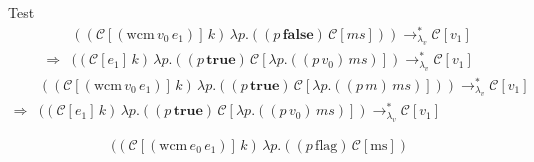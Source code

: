 \documentclass[ms,electronic,twosidetoc,letterpaper,chaptercenter,parttop]{byumsphd}
\begin{document}








\begin{theorem}
Test
\begin{align*}
            &((\mathcal{C}[(\mathrm{wcm}\,v_0\,e_1)]\,k)\,\lambda p.((p\,\mathbf{false})\,\mathcal{C}[\mathit{ms}]))\rightarrow_{\lambda_{v}}^{*}\mathcal{C}[v_1]\\
\Rightarrow &((\mathcal{C}[e_1]\,k)\,\lambda p.((p\,\mathbf{true})\,\mathcal{C}[\lambda p.((p\,v_0)\,\mathit{ms})])\rightarrow_{\lambda_{v}}^{*}\mathcal{C}[v_1]
\end{align*}
\begin{align*}
            &((\mathcal{C}[(\mathrm{wcm}\,v_0\,e_1)]\,k)\,\lambda p.((p\,\mathbf{true})\,\mathcal{C}[\lambda p.((p\,m)\,\mathit{ms})]))\rightarrow_{\lambda_{v}}^{*}\mathcal{C}[v_1]\\
\Rightarrow &((\mathcal{C}[e_1]\,k)\,\lambda p.((p\,\mathbf{true})\,\mathcal{C}[\lambda p.((p\,v_0)\,\mathit{ms})])\rightarrow_{\lambda_{v}}^{*}\mathcal{C}[v_1]
\end{align*}
\end{theorem}

\[
((\mathcal{C}[(\mathrm{wcm}\,e_0\,e_1)]\,k)\,\lambda p.((p\,\mathrm{flag})\,\mathcal{C}[\mathrm{ms}])
\]
\end{document}
